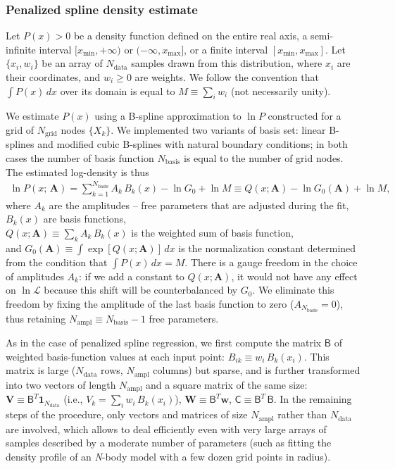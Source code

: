 \documentclass[12pt]{article}
\newcommand{\Nbody}{\textsl{N}-body\xspace}
\newcommand{\bA}{\boldsymbol{A}}
\begin{document}
\subsubsection{Penalized spline density estimate}  \label{sec:MathSplineDensityDetails}

Let $P(x)>0$ be a density function defined on the entire real axis, a semi-infinite interval $[x_\mathrm{min},+\infty)$ or $(-\infty,x_\mathrm{max}]$, or a finite interval $[x_\mathrm{min},x_\mathrm{max}]$.
Let $\{x_i, w_i\}$ be an array of $N_\mathrm{data}$ samples drawn from this distribution, where $x_i$ are their coordinates, and $w_i\ge 0$ are weights. We follow the convention that $\int P(x)\,dx$ over its domain is equal to $M\equiv \sum_i w_i$ (not necessarily unity).

We estimate $P(x)$ using a B-spline approximation to $\ln P$ constructed for a grid of $N_\mathrm{grid}$ nodes $\{X_k\}$. We implemented two variants of basis set: linear B-splines and modified cubic B-splines with natural boundary conditions; in both cases the number of basis function $N_\mathrm{basis}$ is equal to the number of grid nodes. The estimated log-density is thus
\begin{align}
\ln P(x;\,\bA) = \sum_{k=1}^{N_\mathrm{basis}}  A_k\, B_k(x) - \ln G_0 + \ln M \equiv Q(x; \bA) - \ln G_0(\bA) + \ln M ,
\end{align}
where $A_k$ are the amplitudes -- free parameters that are adjusted during the fit,\\
$B_k(x)$  are  basis functions,\\
$Q(x; \bA) \equiv \sum_k  A_k\, B_k(x)$  is the weighted sum of basis function, \\
and $G_0(\bA) \equiv \int \exp[Q(x; \bA)]\, dx$  is the normalization constant determined from the condition that $\int P(x)\,dx = M$.
There is a gauge freedom in the choice of amplitudes $A_k$: if we add a constant to $Q(x; \bA)$, it would not have any effect on $\ln\mathcal{L}$ because this shift will be counterbalanced by $G_0$. We eliminate this freedom by fixing the amplitude of the last basis function to zero ($A_{N_\mathrm{basis}}=0$), thus retaining $N_\mathrm{ampl}\equiv N_\mathrm{basis}-1$ free parameters.

As in the case of penalized spline regression, we first compute the matrix $\mathsf{B}$ of weighted basis-function values at each input point: $B_{ik} \equiv w_i\,B_k(x_i)$. This matrix is large ($N_\mathrm{data}$ rows, $N_\mathrm{ampl}$ columns) but sparse, and is further transformed into two vectors of length $N_\mathrm{ampl}$ and a square matrix of the same size:
$\boldsymbol{V} \equiv \mathsf{B}^T\boldsymbol{1}_{N_\mathrm{data}}$ (i.e., $V_k = \sum_i w_i\,B_k(x_i)$), $\boldsymbol{W} \equiv \mathsf{B}^T\boldsymbol{w}$, $\mathsf{C} \equiv \mathsf{B}^T\,\mathsf{B}$. In the remaining steps of the procedure, only vectors and matrices of size $N_\mathrm{ampl}$ rather than $N_\mathrm{data}$ are involved, which allows to deal efficiently even with very large arrays of samples described by a moderate number of parameters (such as fitting the density profile of an \Nbody model with a few dozen grid points in radius).
\end{document}
